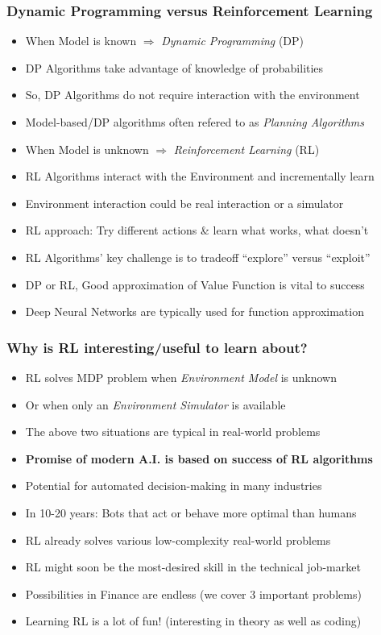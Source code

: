 \documentclass[handout]{beamer}
\begin{document}
\begin{frame}
\frametitle{Dynamic Programming versus Reinforcement Learning}
\pause
\begin{itemize}[<+->]
\item When Model is known $\Rightarrow$ {\em Dynamic Programming} (DP)
\item DP Algorithms take advantage of knowledge of probabilities
\item So, DP Algorithms do not require interaction with the environment
\item Model-based/DP algorithms often refered to as {\em Planning Algorithms}
\item When Model is unknown $\Rightarrow$ {\em Reinforcement Learning} (RL)
\item RL Algorithms interact with the Environment and incrementally learn
\item Environment interaction could be real interaction or a simulator
\item RL approach: Try different actions \& learn what works, what doesn't
\item RL Algorithms' key challenge is to tradeoff ``explore'' versus ``exploit''
\item DP or RL, Good approximation of Value Function is vital to success
\item Deep Neural Networks are typically used for function approximation
\end{itemize}
\end{frame}


\begin{frame}
\frametitle{Why is RL interesting/useful to learn about?}
\pause
\begin{itemize}[<+->]
\item RL solves MDP problem when {\em Environment Model} is unknown
\item Or when only an {\em Environment Simulator} is available
\item The above two situations are typical in real-world problems
\item {\bf Promise of modern A.I. is based on success of RL algorithms}
\item Potential for automated decision-making in many industries
\item In 10-20 years: Bots that act or behave more optimal than humans
\item RL already solves various low-complexity real-world problems
\item RL might soon be the most-desired skill in the technical job-market
\item Possibilities in Finance are endless (we cover 3 important problems)
\item Learning RL is a lot of fun! (interesting in theory as well as coding)
\end{itemize}
\end{frame}
\end{document}
